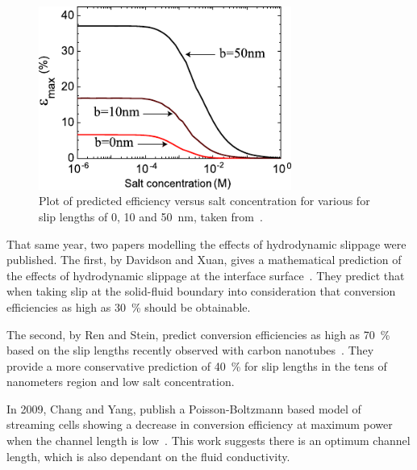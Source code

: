   \begin{figure}
    \centering
    \includegraphics[height=6cm]{content/pt1/graphics/SteinSlipEnchancedChannelEfficiency}
    \caption{\label{fig:Stein_Slip_Prediction}Plot of predicted efficiency versus salt concentration for various for slip lengths of 0, 10 and \SI{50}{\nano\meter}, taken from~\cite{Ren2008}.}
  \end{figure}

  That same year, two papers modelling the effects of hydrodynamic slippage were published.
  The first, by Davidson and Xuan, gives a mathematical prediction of the effects of hydrodynamic slippage at the interface surface~\cite{Davidson2008a}.
  They predict that when taking slip at the solid-fluid boundary into consideration that conversion efficiencies as high as \SI{30}{\percent} should be obtainable.

  The second, by Ren and Stein, predict conversion efficiencies as high as \SI{70}{\percent} based on the slip lengths recently observed with carbon nanotubes~\cite{Ren2008}.
  They provide a more conservative prediction of \SI{40}{\percent} for slip lengths in the tens of nanometers region and low salt concentration.

  In 2009, Chang and Yang, publish a Poisson-Boltzmann based model of streaming cells showing a decrease in conversion efficiency at maximum power when the channel length is low~\cite{Chang2009}.
  This work suggests there is an optimum channel length, which is also dependant on the fluid conductivity.

